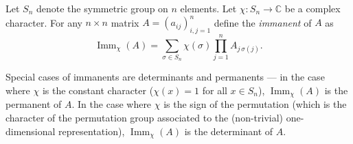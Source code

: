 \documentclass[12pt]{article}
\DeclareMathOperator{\imm}{Imm}
\begin{document}
Let $S_n$ denote the symmetric group on $n$ elements.
Let $\chi:S_n\to\mathbb C$ be a complex character.
For any $n\times n$ matrix $A=(a_{ij})_{i,j=1}^n$ define the \emph{immanent} of $A$ as
\[
\imm_{\chi} (A)=\sum_{\sigma\in {S_n}} \chi(\sigma) \prod_{j=1}^n A_{j \, \sigma( j)}.\]

Special cases of immanents are determinants and permanents --- in the case where $\chi$ is the constant character ($\chi (x) = 1$ for all $x \in S_n$), $\imm_{\chi} (A)$ is the permanent of $A$.  In the case where $\chi$ is the sign of the permutation (which is the character of the permutation group associated to the (non-trivial) one-dimensional representation), $\imm_{\chi} (A)$ is the determinant of $A$.
\end{document}
